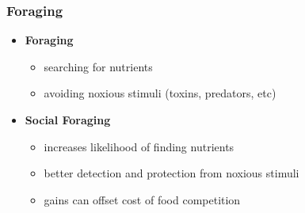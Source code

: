 \documentclass{beamer}
\begin{document}
\begin{frame}
\frametitle{Foraging}
\begin{itemize}
  \item<1-> \textbf{Foraging}
  \begin{itemize}
    \item<1-> searching for nutrients
    \item<1-> avoiding noxious stimuli (toxins, predators, etc)
  \end{itemize}
  \item<2-> \textbf{Social Foraging}
  \begin{itemize}
    \item<2-> increases likelihood of finding nutrients
    \item<2-> better detection and protection from noxious stimuli
    \item<2-> gains can offset cost of food competition
  \end{itemize}
\end{itemize}
\end{frame}
\end{document}
